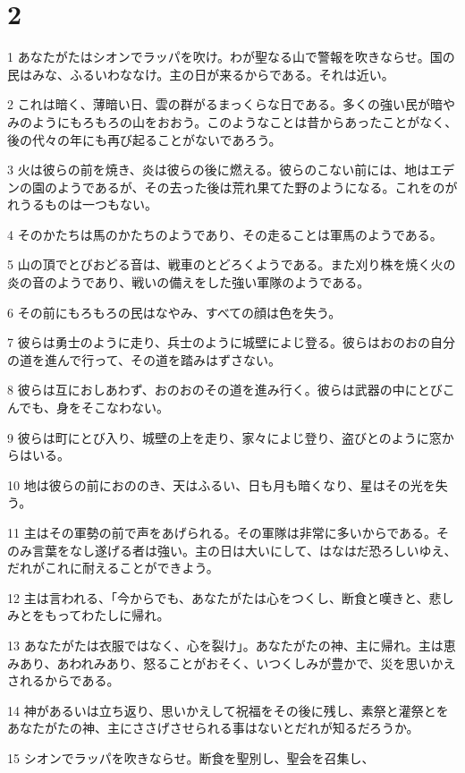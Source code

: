 \chapter{2}

\par 1 あなたがたはシオンでラッパを吹け。わが聖なる山で警報を吹きならせ。国の民はみな、ふるいわななけ。主の日が来るからである。それは近い。
\par 2 これは暗く、薄暗い日、雲の群がるまっくらな日である。多くの強い民が暗やみのようにもろもろの山をおおう。このようなことは昔からあったことがなく、後の代々の年にも再び起ることがないであろう。
\par 3 火は彼らの前を焼き、炎は彼らの後に燃える。彼らのこない前には、地はエデンの園のようであるが、その去った後は荒れ果てた野のようになる。これをのがれうるものは一つもない。
\par 4 そのかたちは馬のかたちのようであり、その走ることは軍馬のようである。
\par 5 山の頂でとびおどる音は、戦車のとどろくようである。また刈り株を焼く火の炎の音のようであり、戦いの備えをした強い軍隊のようである。
\par 6 その前にもろもろの民はなやみ、すべての顔は色を失う。
\par 7 彼らは勇士のように走り、兵士のように城壁によじ登る。彼らはおのおの自分の道を進んで行って、その道を踏みはずさない。
\par 8 彼らは互におしあわず、おのおのその道を進み行く。彼らは武器の中にとびこんでも、身をそこなわない。
\par 9 彼らは町にとび入り、城壁の上を走り、家々によじ登り、盗びとのように窓からはいる。
\par 10 地は彼らの前におののき、天はふるい、日も月も暗くなり、星はその光を失う。
\par 11 主はその軍勢の前で声をあげられる。その軍隊は非常に多いからである。そのみ言葉をなし遂げる者は強い。主の日は大いにして、はなはだ恐ろしいゆえ、だれがこれに耐えることができよう。
\par 12 主は言われる、「今からでも、あなたがたは心をつくし、断食と嘆きと、悲しみとをもってわたしに帰れ。
\par 13 あなたがたは衣服ではなく、心を裂け」。あなたがたの神、主に帰れ。主は恵みあり、あわれみあり、怒ることがおそく、いつくしみが豊かで、災を思いかえされるからである。
\par 14 神があるいは立ち返り、思いかえして祝福をその後に残し、素祭と灌祭とをあなたがたの神、主にささげさせられる事はないとだれが知るだろうか。
\par 15 シオンでラッパを吹きならせ。断食を聖別し、聖会を召集し、
